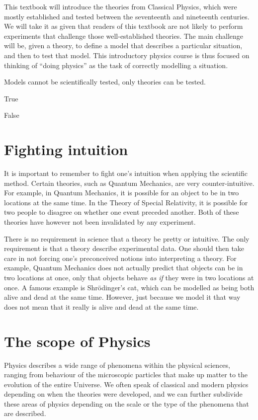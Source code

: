 This textbook will introduce the theories from Classical Physics, which were mostly established and tested between the seventeenth and nineteenth centuries. We will take it as given that readers of this textbook are not likely to perform experiments that challenge those well-established theories. The main challenge will be, given a theory, to define a model that describes a particular situation, and then to test that model. This introductory physics course is thus focused on thinking of ``doing physics'' as the task of correctly modelling a situation.

\begin{checkpointMC}{Models cannot be scientifically tested, only theories can be tested.}
\item True
\item False
\end{checkpointMC}

\section{Fighting intuition}
It is important to remember to fight one's intuition when applying the scientific method. Certain theories, such as Quantum Mechanics, are very counter-intuitive. For example, in Quantum Mechanics, it is possible for an object to be in two locations at the same time. In the Theory of Special Relativity, it is possible for two people to disagree on whether one event preceded another. Both of these theories have however not been invalidated by any experiment.

There is no requirement in science that a theory be pretty or intuitive. The only requirement is that a theory describe experimental data. One should then take care in not forcing one's preconceived notions into interpreting a theory. For example, Quantum Mechanics does not actually predict that objects can be in two locations at once, only that objects behave \textit{as if} they were in two locations at once. A famous example is Shr\"odinger's cat, which can be modelled as being both alive and dead at the same time. However, just because we model it that way does not mean that it really is alive and dead at the same time. 

\section{The scope of Physics}
Physics describes a wide range of phenomena within the physical sciences, ranging from behaviour of the microscopic particles that make up matter to the evolution of the entire Universe. We often speak of classical and modern physics depending on when the theories were developed, and we can further subdivide these areas of physics depending on the scale or the type of the phenomena that are described.

